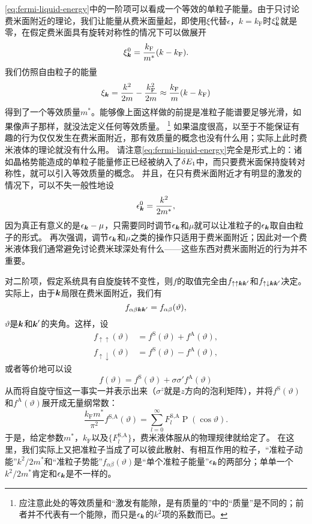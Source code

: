 \documentclass[hyperref, UTF8, a4paper]{ctexart}
\DeclareMathOperator{\legpoly}{P}
\begin{document}
\eqref{eq:fermi-liquid-energy}中的一阶项可以看成一个等效的单粒子能量。由于只讨论费米面附近的理论，我们让能量从费米面量起，即使用$\xi$代替$\epsilon$，$k=k_\text{F}$时$\xi^0_{\vb*{k}}$就是零，在假定费米面具有旋转对称性的情况下可以做展开
\[
    \xi^0_{\vb*{k}} = \frac{k_\text{F}}{m^*} (k - k_\text{F}).
\]
我们仿照自由粒子的能量
\[
    \xi_{\vb*{k}} = \frac{k^2}{2m} - \frac{k_\text{F}^2}{2m} \approx \frac{k_\text{F}}{m} (k - k_\text{F})
\]
得到了一个等效质量$m^*$。能够像上面这样做的前提是准粒子能谱要足够光滑，如果像声子那样，就没法定义任何等效质量。%
\footnote{应注意此处的等效质量和“激发有能隙，是有质量的”中的“质量”是不同的；前者并不代表有一个能隙，而只是$\epsilon_{\vb*{k}}$的$k^2$项的系数而已。}%
如果温度很高，以至于不能保证有趣的行为仅仅发生在费米面附近，那有效质量的概念也没有什么用；实际上此时费米液体的理论就没有什么用。
请注意\eqref{eq:fermi-liquid-energy}完全是形式上的：诸如晶格势能造成的单粒子能量修正已经被纳入了$\var{E_1}$中，而只要费米面保持旋转对称性，就可以引入等效质量的概念。
并且，在只有费米面附近才有明显的激发的情况下，可以不失一般性地设
\[
    \epsilon_{\vb*{k}}^0 = \frac{k^2}{2m^*},
\]
因为真正有意义的是$\epsilon_{\vb*{k}} - \mu$，只需要同时调节$\epsilon_{\vb*{k}}$和$\mu$就可以让准粒子的$\epsilon_{\vb*{k}}$取自由粒子的形式。
再次强调，调节$\epsilon_{\vb*{k}}$和$\mu$之类的操作只适用于费米面附近；因此对一个费米液体我们通常避免讨论费米球深处有什么——这些东西对费米面附近的行为并不重要。

对二阶项，假定系统具有自旋旋转不变性，则$f$的取值完全由$f_{\uparrow \uparrow \vb*{k} \vb*{k}'}$和$f_{\uparrow \downarrow \vb*{k} \vb*{k}'}$决定。
实际上，由于$\vb*{k}$局限在费米面附近，我们有
\[
    f_{\alpha \beta \vb*{k} \vb*{k}'} = f_{\alpha \beta}(\vartheta),
\]
$\vartheta$是$\vb*{k}$和$\vb*{k}'$的夹角。这样，设
\begin{equation}
    \begin{aligned}
        f_{\uparrow \uparrow}(\vartheta) &= f^\text{S}(\vartheta) + f^\text{A}(\vartheta), \\
        f_{\uparrow \downarrow}(\vartheta) &= f^\text{S}(\vartheta) - f^\text{A}(\vartheta),
    \end{aligned}
\end{equation}
或者等价地可以设
\begin{equation}
    {f}(\vartheta) = f^\text{S}(\vartheta) + {\sigma} {\sigma}' f^\text{A}(\vartheta)
\end{equation}
从而将自旋守恒这一事实一并表示出来（${\sigma}^z$就是$z$方向的泡利矩阵），并将$f^\text{S}(\vartheta)$和$f^\text{A}(\vartheta)$展开成无量纲常数：
\begin{equation}
    \frac{k_\text{F} m^*}{\pi^2} f^\text{S,A}(\vartheta) = \sum_{l=0}^\infty F_l^\text{S,A} \legpoly (\cos \vartheta).
\end{equation}
于是，给定参数$m^*$，$k_\text{F}$以及$\{F_l^\text{S,A}\}$，费米液体服从的物理规律就给定了。
在这里，我们实际上又把准粒子当成了可以彼此散射、有相互作用的粒子，“准粒子动能”$k^2/2m^*$和“准粒子势能”$f_{\alpha \beta}(\vartheta)$是“单个准粒子能量”$\epsilon_{\vb*{k}}$的两部分；单单一个$k^2/2m^*$肯定和$\epsilon_{\vb*{k}}$是不一样的。
\end{document}
